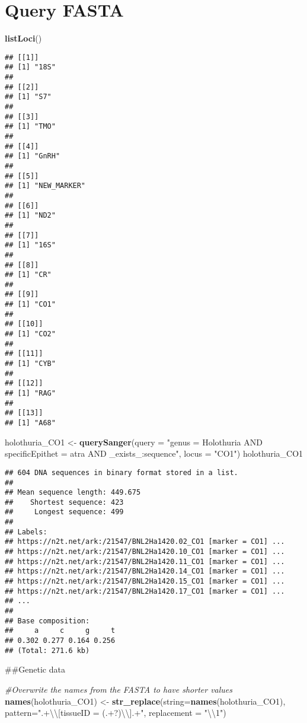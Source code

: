 \documentclass[
]{article}
\newenvironment{Shaded}{\begin{snugshade}}{\end{snugshade}}
\newcommand{\CharTok}[1]{\textcolor[rgb]{0.31,0.60,0.02}{#1}}
\newcommand{\CommentTok}[1]{\textcolor[rgb]{0.56,0.35,0.01}{\textit{#1}}}
\newcommand{\DataTypeTok}[1]{\textcolor[rgb]{0.13,0.29,0.53}{#1}}
\newcommand{\KeywordTok}[1]{\textcolor[rgb]{0.13,0.29,0.53}{\textbf{#1}}}
\newcommand{\NormalTok}[1]{#1}
\newcommand{\StringTok}[1]{\textcolor[rgb]{0.31,0.60,0.02}{#1}}
\begin{document}
\hypertarget{query-fasta}{%
\section{Query FASTA}\label{query-fasta}}

\begin{Shaded}
\begin{Highlighting}[]
\KeywordTok{listLoci}\NormalTok{()}
\end{Highlighting}
\end{Shaded}

\begin{verbatim}
## [[1]]
## [1] "18S"
## 
## [[2]]
## [1] "S7"
## 
## [[3]]
## [1] "TMO"
## 
## [[4]]
## [1] "GnRH"
## 
## [[5]]
## [1] "NEW_MARKER"
## 
## [[6]]
## [1] "ND2"
## 
## [[7]]
## [1] "16S"
## 
## [[8]]
## [1] "CR"
## 
## [[9]]
## [1] "CO1"
## 
## [[10]]
## [1] "CO2"
## 
## [[11]]
## [1] "CYB"
## 
## [[12]]
## [1] "RAG"
## 
## [[13]]
## [1] "A68"
\end{verbatim}

\begin{Shaded}
\begin{Highlighting}[]
\NormalTok{holothuria_CO1 <-}\StringTok{ }\KeywordTok{querySanger}\NormalTok{(}\DataTypeTok{query =} \StringTok{"genus = Holothuria AND specificEpithet = atra AND _exists_:sequence"}\NormalTok{, }
                              \DataTypeTok{locus =} \StringTok{"CO1"}\NormalTok{)}
\NormalTok{holothuria_CO1}
\end{Highlighting}
\end{Shaded}

\begin{verbatim}
## 604 DNA sequences in binary format stored in a list.
## 
## Mean sequence length: 449.675 
##    Shortest sequence: 423 
##     Longest sequence: 499 
## 
## Labels:
## https://n2t.net/ark:/21547/BNL2Ha1420.02_CO1 [marker = CO1] ...
## https://n2t.net/ark:/21547/BNL2Ha1420.10_CO1 [marker = CO1] ...
## https://n2t.net/ark:/21547/BNL2Ha1420.11_CO1 [marker = CO1] ...
## https://n2t.net/ark:/21547/BNL2Ha1420.14_CO1 [marker = CO1] ...
## https://n2t.net/ark:/21547/BNL2Ha1420.15_CO1 [marker = CO1] ...
## https://n2t.net/ark:/21547/BNL2Ha1420.17_CO1 [marker = CO1] ...
## ...
## 
## Base composition:
##     a     c     g     t 
## 0.302 0.277 0.164 0.256 
## (Total: 271.6 kb)
\end{verbatim}

\#\#Genetic data

\begin{Shaded}
\begin{Highlighting}[]
\CommentTok{#Overwrite the names from the FASTA to have shorter values}
\KeywordTok{names}\NormalTok{(holothuria_CO1) <-}\StringTok{ }\KeywordTok{str_replace}\NormalTok{(}\DataTypeTok{string=}\KeywordTok{names}\NormalTok{(holothuria_CO1),}
                                     \DataTypeTok{pattern=}\StringTok{".+}\CharTok{\textbackslash{}\textbackslash{}}\StringTok{[tissueID = (.+?)}\CharTok{\textbackslash{}\textbackslash{}}\StringTok{].+"}\NormalTok{, }\DataTypeTok{replacement =} \StringTok{"}\CharTok{\textbackslash{}\textbackslash{}}\StringTok{1"}\NormalTok{)}
\end{Highlighting}
\end{Shaded}
\end{document}
